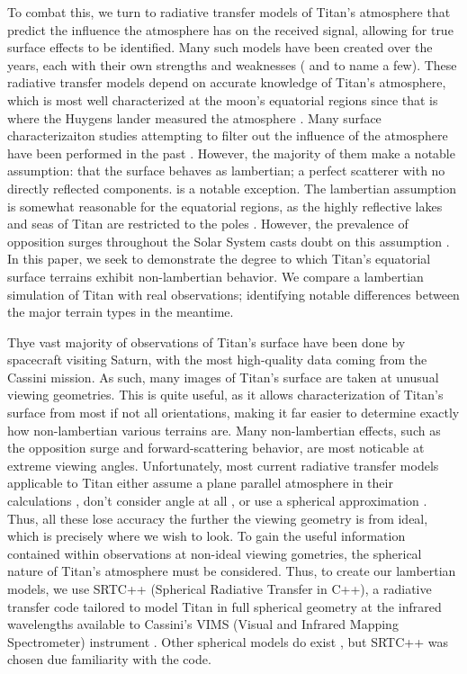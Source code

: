 \documentclass[twocolumn,linenumbers]{aastex631}
\begin{document}
To combat this, we turn to radiative transfer models of Titan's atmosphere that predict the influence the atmosphere has on the received signal, allowing for true surface effects to be identified. Many such models have been created over the years, each with their own strengths and weaknesses (\cite{Griffith2012, Xu2013, Barnes2018, Corlies2021, Rannou2021} and \cite{EsSayeh2023} to name a few). These radiative transfer models depend on accurate knowledge of Titan's atmosphere, which is most well characterized at the moon's equatorial regions since that is where the Huygens lander measured the atmosphere \citep{Tomasko2008}. Many surface characterizaiton studies attempting to filter out the influence of the atmosphere have been performed in the past \citep{Buratti2006, Soderblom2009, Kazeminejad2011, Brossier2018, EsSayeh2023, Solomonidou2024}. However, the majority of them make a notable assumption: that the surface behaves as lambertian; a perfect scatterer with no directly reflected components. \cite{Buratti2006} is a notable exception. The lambertian assumption is somewhat reasonable for the equatorial regions, as the highly reflective lakes and seas of Titan are restricted to the poles \citep{Hayes2016}. However, the prevalence of opposition surges throughout the Solar System casts doubt on this assumption \citep{Deau2009}. In this paper, we seek to demonstrate the degree to which Titan's equatorial surface terrains exhibit non-lambertian behavior. We compare a lambertian simulation of Titan with real observations; identifying notable differences between the major terrain types in the meantime.

Thye vast majority of observations of Titan's surface have been done by spacecraft visiting Saturn, with the most high-quality data coming from the Cassini mission. As such, many images of Titan's surface are taken at unusual viewing geometries. This is quite useful, as it allows characterization of Titan's surface from most if not all orientations, making it far easier to determine exactly how non-lambertian various terrains are. Many non-lambertian effects, such as the opposition surge \citep{Deau2009} and forward-scattering behavior, are most noticable at extreme viewing angles. Unfortunately, most current radiative transfer models applicable to Titan either assume a plane parallel atmosphere in their calculations \citep{Griffith2012, EsSayeh2023}, don't consider angle at all \citep{Rannou2021}, or use a spherical approximation \citep{Corlies2021}. Thus, all these lose accuracy the further the viewing geometry is from ideal, which is precisely where we wish to look. To gain the useful information contained within observations at non-ideal viewing gometries, the spherical nature of Titan's atmosphere must be considered. Thus, to create our lambertian models, we use SRTC++ (Spherical Radiative Transfer in C++), a radiative transfer code tailored to model Titan in full spherical geometry at the infrared wavelengths available to Cassini's VIMS (Visual and Infrared Mapping Spectrometer) instrument \citep{Barnes2018}. Other spherical models do exist \citep{Xu2013}, but SRTC++ was chosen due familiarity with the code.
\end{document}
